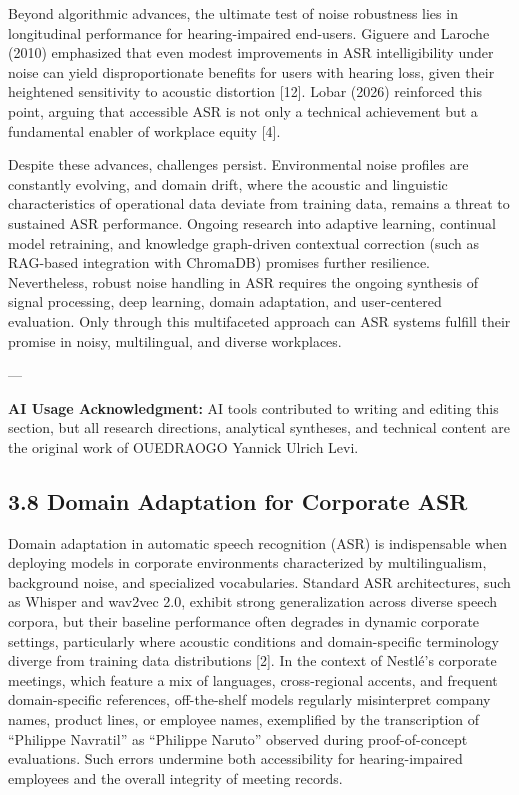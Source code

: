 \documentclass[12pt,a4paper]{article}
\begin{document}
Beyond algorithmic advances, the ultimate test of noise robustness lies in longitudinal performance for hearing-impaired end-users. Giguere and Laroche (2010) emphasized that even modest improvements in ASR intelligibility under noise can yield disproportionate benefits for users with hearing loss, given their heightened sensitivity to acoustic distortion [12]. Lobar (2026) reinforced this point, arguing that accessible ASR is not only a technical achievement but a fundamental enabler of workplace equity [4].


Despite these advances, challenges persist. Environmental noise profiles are constantly evolving, and domain drift, where the acoustic and linguistic characteristics of operational data deviate from training data, remains a threat to sustained ASR performance. Ongoing research into adaptive learning, continual model retraining, and knowledge graph-driven contextual correction (such as RAG-based integration with ChromaDB) promises further resilience. Nevertheless, robust noise handling in ASR requires the ongoing synthesis of signal processing, deep learning, domain adaptation, and user-centered evaluation. Only through this multifaceted approach can ASR systems fulfill their promise in noisy, multilingual, and diverse workplaces.


---


\textbf{AI Usage Acknowledgment:} AI tools contributed to writing and editing this section, but all research directions, analytical syntheses, and technical content are the original work of OUEDRAOGO Yannick Ulrich Levi.


\subsection{3.8 Domain Adaptation for Corporate ASR}


Domain adaptation in automatic speech recognition (ASR) is indispensable when deploying models in corporate environments characterized by multilingualism, background noise, and specialized vocabularies. Standard ASR architectures, such as Whisper and wav2vec 2.0, exhibit strong generalization across diverse speech corpora, but their baseline performance often degrades in dynamic corporate settings, particularly where acoustic conditions and domain-specific terminology diverge from training data distributions [2]. In the context of Nestlé’s corporate meetings, which feature a mix of languages, cross-regional accents, and frequent domain-specific references, off-the-shelf models regularly misinterpret company names, product lines, or employee names, exemplified by the transcription of “Philippe Navratil” as “Philippe Naruto” observed during proof-of-concept evaluations. Such errors undermine both accessibility for hearing-impaired employees and the overall integrity of meeting records.
\end{document}
